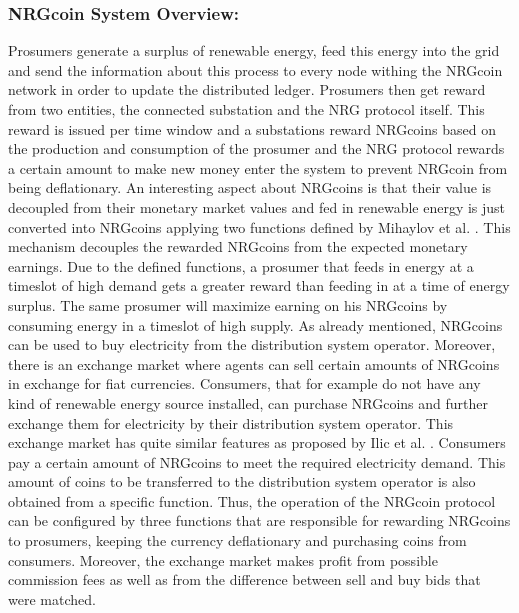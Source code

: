\documentclass[runningheads]{llncs}
\begin{document}
\subsubsection{NRGcoin System Overview:} Prosumers generate a surplus of renewable energy, feed this energy into the grid and send the information about this process to every node withing the NRGcoin network in order to update the distributed ledger. Prosumers then get reward from two entities, the connected substation and the NRG protocol itself. This reward is issued per time window and a substations reward NRGcoins based on the production and consumption of the prosumer and the NRG protocol rewards a certain amount to make new money enter the system to prevent NRGcoin from being deflationary. \newline
An interesting aspect about NRGcoins is that their value is decoupled from their monetary market values and fed in renewable energy is just converted into NRGcoins applying two functions defined by Mihaylov et al. \cite{mihaylov_nrgcoin}. This mechanism decouples the rewarded NRGcoins from the expected monetary earnings. Due to the defined functions, a prosumer that feeds in energy at a timeslot of high demand gets a greater reward than feeding in at a time of energy surplus. The same prosumer will maximize earning on his NRGcoins by consuming energy in a timeslot of high supply. \newline
As already mentioned, NRGcoins can be used to buy electricity from the distribution system operator. Moreover, there is an exchange market where agents can sell certain amounts of NRGcoins in exchange for fiat currencies. Consumers, that for example do not have any kind of renewable energy source installed, can purchase NRGcoins and further exchange them for electricity by their distribution system operator. This exchange market has quite similar features as proposed by Ilic et al. \cite{ilic_smart_grid_neighbourhoods}.
Consumers pay a certain amount of NRGcoins to meet the required electricity demand. This amount of coins to be transferred to the distribution system operator is also obtained from a specific function. Thus, the operation of the NRGcoin protocol can be configured by three functions that are responsible for rewarding NRGcoins to prosumers, keeping the currency deflationary and purchasing coins from consumers. \cite{mihaylov_nrgcoin}
Moreover, the exchange market makes profit from possible commission fees as well as from the difference between sell and buy bids that were matched.
\end{document}
